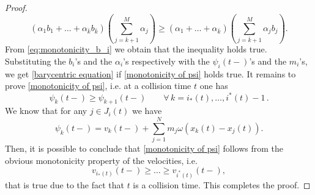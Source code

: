 \documentclass[10pt,a4paper]{amsart}
\begin{document}
\begin{proof}
\begin{equation*}
        \left(\alpha_1b_1+\dots+\alpha_{\bar k}b_{\bar k}\right)\left(\sum_{j=\bar k+1}^M\alpha_j\right)
        \geq\left(\alpha_1+\dots+\alpha_{\bar k}\right)\left(\sum_{j=\bar k+1}^M\alpha_jb_j\right).
    \end{equation*}
    From \eqref{eq:monotonicity_b_i}  we obtain that the inequality holds true. 
    Substituting the $b_i$'s and the $\alpha_i$'s respectively with the $\psi_i(t-)$'s and the $m_i$'s, 
    we get \eqref{barycentric equation} if \eqref{monotonicity of psi} holds true.
    \newline
    It remains to prove \eqref{monotonicity of psi}, i.e. at a collision time $t$ one has
 \begin{equation*}
        \psi_{k}(t-)\geq\psi_{k+1}(t-)\qquad \forall\, k = i_*(t), \ldots, i^*(t)-1\,.
    \end{equation*}
    We know that for any $j\in J_i(t)$ we have
    $$
    \psi_k(t-)=v_k(t-)+\sum_{j=1}^N m_j\omega(x_k(t)-x_j(t)).
    $$
    Then, it is possible to conclude that \eqref{monotonicity of psi} follows 
    from the obvious monotonicity property of the velocities, i.e.
    \begin{equation*}
        v_{i_*(t)}(t-)\geq\dots\geq v_{i^*(t)}(t-),
    \end{equation*}
   that is true due to the fact that $t$ is a collision time. This completes the proof.
\end{proof}
\end{document}
